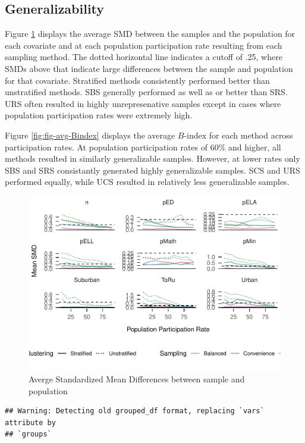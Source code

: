 \documentclass[man,floatsintext]{apa6}
\begin{document}
\hypertarget{generalizability-1}{%
\subsection{Generalizability}\label{generalizability-1}}

Figure \ref{fig:fig-SMD-by-Var} displays the average SMD between the samples and the population for each covariate and at each population participation rate resulting from each sampling method. The dotted horizontal line indicates a cutoff of .25, where SMDs above that indicate large differences between the sample and population for that covariate. Stratified methods consistently performed better than unstratified methods. SBS generally performed as well as or better than SRS. URS often resulted in highly unrepresenative samples except in cases where population participation rates were extremely high.

Figure \ref{fig:fig-avg-Bindex} displays the average \(B\)-index for each method across participation rates. At population participation rates of 60\% and higher, all methods resulted in similarly generalizable samples. However, at lower rates only SBS and SRS consistantly generated highly generalizable samples. SCS and URS performed equally, while UCS resulted in relatively less generalizable samples.

\begin{figure}
\includegraphics{GenSamp_Paper_files/figure-latex/fig-SMD-by-Var-1} \caption{Averge Standardized Mean Differences between sample and population}\label{fig:fig-SMD-by-Var}
\end{figure}

\begin{verbatim}
## Warning: Detecting old grouped_df format, replacing `vars` attribute by
## `groups`
\end{verbatim}
\end{document}
